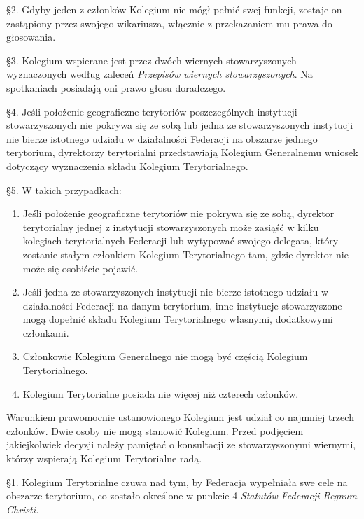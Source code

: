 \S{}2. Gdyby jeden z członków Kolegium nie mógł pełnić swej funkcji, zostaje on zastąpiony przez swojego wikariusza, włącznie z przekazaniem mu prawa do głosowania.

\S{}3. Kolegium wspierane jest przez dwóch wiernych stowarzyszonych wyznaczonych według zaleceń {\em Przepisów wiernych stowarzyszonych}. Na spotkaniach posiadają oni prawo głosu doradczego.

\S{}4. Jeśli położenie geograficzne terytoriów poszczególnych instytucji stowarzyszonych nie pokrywa się ze sobą lub jedna ze stowarzyszonych instytucji nie bierze istotnego udziału w działalności Federacji na obszarze jednego terytorium, dyrektorzy terytorialni przedstawiają Kolegium Generalnemu wniosek dotyczący wyznaczenia składu Kolegium Terytorialnego.

\S{}5. W takich przypadkach:
\begin{enumerate}
	
	\item Jeśli położenie geograficzne terytoriów nie pokrywa się ze sobą, dyrektor terytorialny jednej z instytucji stowarzyszonych może zasiąść w kilku kolegiach terytorialnych Federacji lub wytypować swojego delegata, który zostanie stałym członkiem Kolegium Terytorialnego tam, gdzie dyrektor nie może się osobiście pojawić.
	
	\item Jeśli jedna ze stowarzyszonych instytucji nie bierze istotnego udziału w działalności Federacji na danym terytorium, inne instytucje stowarzyszone mogą dopełnić składu Kolegium Terytorialnego własnymi, dodatkowymi członkami.
	
	\item Członkowie Kolegium Generalnego nie mogą być częścią Kolegium Terytorialnego.
	
	\item Kolegium Terytorialne posiada nie więcej niż czterech członków.
\end{enumerate}

 Warunkiem prawomocnie ustanowionego Kolegium jest udział co najmniej trzech członków. Dwie osoby nie mogą stanowić Kolegium. Przed podjęciem jakiejkolwiek decyzji należy pamiętać o konsultacji ze stowarzyszonymi wiernymi, którzy wspierają Kolegium Terytorialne radą.

\filbreak{}

 \S{}1. Kolegium Terytorialne czuwa nad tym, by Federacja wypełniała swe cele na obszarze terytorium, co zostało określone w punkcie 4 {\em Statutów Federacji Regnum Christi.}

